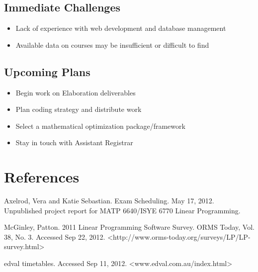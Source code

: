 \documentclass[11pt]{article}
\begin{document}
\subsection{Immediate Challenges} %
\begin{itemize}
\item Lack of experience with web development and database management
\item Available data on courses may be insufficient or difficult to find
\end{itemize}

\subsection{Upcoming Plans}
\begin{itemize}
\item Begin work on Elaboration deliverables
\item Plan coding strategy and distribute work
\item Select a mathematical optimization package/framework
\item Stay in touch with Assistant Registrar
\end{itemize}

\section*{References}

\hspace{0.25in}Axelrod, Vera and Katie Sebastian. Exam Scheduling. May 17, 2012. Unpublished project report for MATP 6640/ISYE 6770 Linear Programming.

McGinley,  Patton. 2011 Linear Programming Software Survey. ORMS Today, Vol. 38, No. 3.  Accessed Sep 22, 2012. <http://www.orms-today.org/surveys/LP/LP-survey.html>

edval timetables. Accessed Sep 11, 2012. <www.edval.com.au/index.html>
\end{document}
